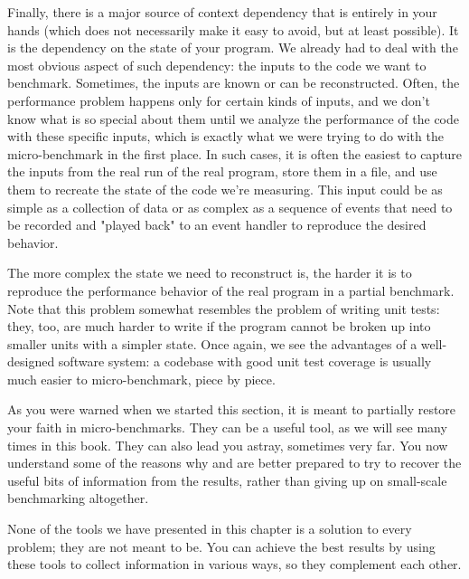 Finally, there is a major source of context dependency that is entirely in your hands (which does not necessarily make it easy to avoid, but at least possible). It is the dependency on the state of your program. We already had to deal with the most obvious aspect of such dependency: the inputs to the code we want to benchmark. Sometimes, the inputs are known or can be reconstructed. Often, the performance problem happens only for certain kinds of inputs, and we don't know what is so special about them until we analyze the performance of the code with these specific inputs, which is exactly what we were trying to do with the micro-benchmark in the first place. In such cases, it is often the easiest to capture the inputs from the real run of the real program, store them in a file, and use them to recreate the state of the code we're measuring. This input could be as simple as a collection of data or as complex as a sequence of events that need to be recorded and "played back" to an event handler to reproduce the desired behavior.

The more complex the state we need to reconstruct is, the harder it is to reproduce the performance behavior of the real program in a partial benchmark. Note that this problem somewhat resembles the problem of writing unit tests: they, too, are much harder to write if the program cannot be broken up into smaller units with a simpler state. Once again, we see the advantages of a well-designed software system: a codebase with good unit test coverage is usually much easier to micro-benchmark, piece by piece.

As you were warned when we started this section, it is meant to partially restore your faith in micro-benchmarks. They can be a useful tool, as we will see many times in this book. They can also lead you astray, sometimes very far. You now understand some of the reasons why and are better prepared to try to recover the useful bits of information from the results, rather than giving up on small-scale benchmarking altogether.

None of the tools we have presented in this chapter is a solution to every problem; they are not meant to be. You can achieve the best results by using these tools to collect information in various ways, so they complement each other.






